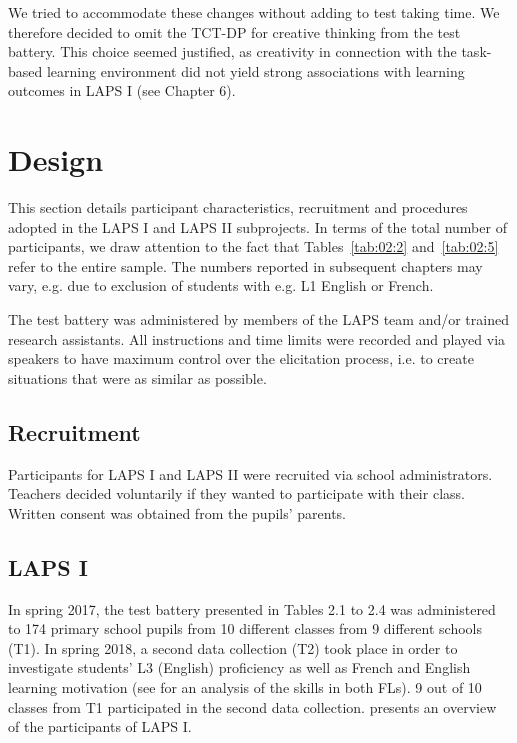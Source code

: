 \documentclass[output=paper]{langsci/langscibook}
\begin{document}
We tried to accommodate these changes without adding to test taking time. We therefore decided to omit the TCT-DP for creative thinking from the test battery. This choice seemed justified, as creativity in connection with the task-based learning environment did not yield strong associations with learning outcomes in LAPS I (see Chapter 6). 

\section{Design}

This section details participant characteristics, recruitment and procedures adopted in the LAPS I and LAPS II subprojects. In terms of the total number of participants, we draw attention to the fact that Tables~\ref{tab:02:2} and~\ref{tab:02:5} refer to the entire sample. The numbers reported in subsequent chapters may vary, e.g. due to exclusion of students with e.g. L1 English or French. 

The test battery was administered by members of the LAPS team and/or trained research assistants. All instructions and time limits were recorded and played via speakers to have maximum control over the elicitation process, i.e. to create situations that were as similar as possible. 

 \subsection{Recruitment}


Participants for LAPS I and LAPS II were recruited via school administrators. Teachers decided voluntarily if they wanted to participate with their class. Written consent was obtained from the pupils’ parents. 

 \subsection{LAPS I}


In spring 2017, the test battery presented in Tables 2.1 to 2.4 was administered to 174 primary school pupils from 10 different classes from 9 different schools (T1). In spring 2018, a second data collection (T2) took place in order to investigate students’ L3 (English) proficiency as well as French and English learning motivation (see \citealt{BertheleUdry2019} for an analysis of the skills in both FLs). 9 out of 10 classes from T1 participated in the second data collection.  presents an overview of the participants of LAPS I.
\end{document}

